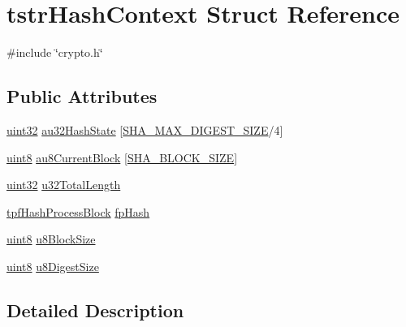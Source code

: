 \hypertarget{structtstrHashContext}{}\section{tstr\+Hash\+Context Struct Reference}
\label{structtstrHashContext}


{\ttfamily \#include \char`\"{}crypto.\+h\char`\"{}}

\subsection*{Public Attributes}
\begin{DoxyCompactItemize}
\item 
\hyperlink{group__DataT_ga100e7c691a47d6978527c479a0158245}{uint32} \hyperlink{structtstrHashContext_a98c3033fa6c3fcfb2fde0f8d9e4b77cd}{au32\+Hash\+State} \mbox{[}\hyperlink{third__party_2atmel_2devices_2wilc1000_2drv__hash_2crypto_8h_a0391b26f91f9df705826a5770d1b34b5}{S\+H\+A\+\_\+\+M\+A\+X\+\_\+\+D\+I\+G\+E\+S\+T\+\_\+\+S\+I\+ZE}/4\mbox{]}
\item 
\hyperlink{group__DataT_ga4df709a77647e870bbf1d955b8edc9a6}{uint8} \hyperlink{structtstrHashContext_ad800fad9e6b7da0be3599969634ae4dd}{au8\+Current\+Block} \mbox{[}\hyperlink{third__party_2atmel_2devices_2wilc1000_2drv__hash_2crypto_8h_a7b4bbf50f237712b1e9bcc3283e41199}{S\+H\+A\+\_\+\+B\+L\+O\+C\+K\+\_\+\+S\+I\+ZE}\mbox{]}
\item 
\hyperlink{group__DataT_ga100e7c691a47d6978527c479a0158245}{uint32} \hyperlink{structtstrHashContext_a1f34ee5e16cfba096d97cda5afcdf0d0}{u32\+Total\+Length}
\item 
\hyperlink{third__party_2atmel_2devices_2wilc1000_2drv__hash_2crypto_8h_ac57cffcf2e97ad50284a1796cddcd0da}{tpf\+Hash\+Process\+Block} \hyperlink{structtstrHashContext_a85933854439e5041779b7c36d03f2ed1}{fp\+Hash}
\item 
\hyperlink{group__DataT_ga4df709a77647e870bbf1d955b8edc9a6}{uint8} \hyperlink{structtstrHashContext_a98d5af4e1c764a7b1571aa0ebdb4df6b}{u8\+Block\+Size}
\item 
\hyperlink{group__DataT_ga4df709a77647e870bbf1d955b8edc9a6}{uint8} \hyperlink{structtstrHashContext_a0ac827ded50656132aba2801121618e7}{u8\+Digest\+Size}
\end{DoxyCompactItemize}


\subsection{Detailed Description}


